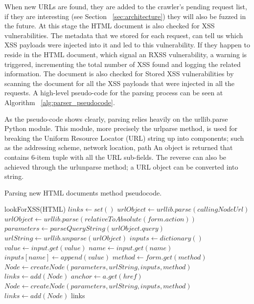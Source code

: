 When new URLs are found, they are added to the crawler's pending request list, if they are interesting (see Section ~\ref{sec:architecture}) they will also be fuzzed in the future. At this stage the HTML document is also checked for XSS vulnerabilities. The metadata that we stored for each request, can tell us which XSS payloads were injected into it and led to this vulnerability. If they happen to reside in the HTML document, which signal an RXSS vulnerability, a warning is triggered, incrementing the total number of XSS found and logging the related information. The document is also checked for Stored XSS vulnerabilities by scanning the document for all the XSS payloads that were injected in all the requests. A high-level pseudo-code for the parsing process can be seen at Algorithm ~\ref{alg:parser_pseudocode}. 

As the pseudo-code shows clearly, parsing relies heavily on the urllib.parse~\cite{urllib_parse} Python module. This module, more precisely the urlparse method, is used for breaking the Uniform Resource Locator (URL) string up into components; such as the addressing scheme, network location, path \etc An object is returned that contains 6-item tuple with all the URL sub-fields. The reverse can also be achieved through the urlunparse method; a URL object can be converted into string.

\begin{algorithm}
 
 \caption{Parsing new HTML documents method pseudocode.}
 \label{alg:parser_pseudocode}
 
 \begin{algorithmic}
	\STATE lookForXSS(HTML)  
	\STATE $links \leftarrow set()$ 
 			\STATE $urlObject \leftarrow urllib.parse(callingNodeUrl)$
		 \ELSE 
 			\STATE $urlObject \leftarrow urllib.parse(relativeToAbsolute(form.action))$
		 \ENDIF
		\STATE $parameters \leftarrow parseQueryString(urlObject.query)$ 
		\STATE $urlString \leftarrow urllib.unparse(urlObject)$ 
		\STATE $inputs \leftarrow dictionary()$ 
			\STATE $value \leftarrow input.get(value)$			 
	 		\STATE $name \leftarrow input.get(name)$	
	 		\STATE $inputs[name] \leftarrow append(value)$	 
		\ENDFOR
		\STATE $method \leftarrow form.get(method)$	
		\STATE $Node \leftarrow createNode(parameters, urlString, inputs, method)$	
		\STATE $links \leftarrow add(Node)$
			\STATE $anchor \leftarrow a.get(href)$			 
		\ENDFOR
		\STATE $Node \leftarrow createNode(parameters, urlString, inputs, method)$	
		\STATE $links \leftarrow add(Node)$
	\ENDFOR
	\RETURN links
 \end{algorithmic}
\end{algorithm}

